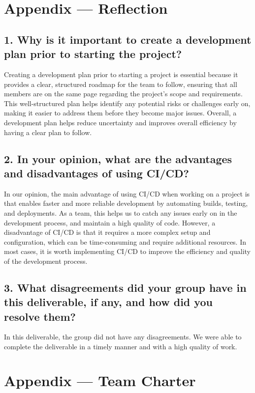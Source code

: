 \documentclass{article}
\begin{document}
\newpage{}

\section*{Appendix --- Reflection}

\iffalse
\wss{Not required for CAS 741}
\fi


\subsection*{1. Why is it important to create a development plan prior to starting the project?}
Creating a development plan prior to starting a project is essential because it provides a clear, structured roadmap for the team to follow, ensuring that all members are on the same page regarding the project's scope and requirements. This well-structured plan helps identify any potential risks or challenges early on, making it easier to address them before they become major issues. Overall, a development plan helps reduce uncertainty and improves overall efficiency by having a clear plan to follow.

\subsection*{2. In your opinion, what are the advantages and disadvantages of using CI/CD?}
In our opinion, the main advantage of using CI/CD when working on a project is that enables faster and more reliable development by automating builds, testing, and deployments. As a team, this helps us to catch any issues early on in the development process, and maintain a high quality of code. However, a disadvantage of CI/CD is that it requires a more complex setup and configuration, which can be time-consuming and require additional resources. In most cases, it is worth implementing CI/CD to improve the efficiency and quality of the development process.

\subsection*{3. What disagreements did your group have in this deliverable, if any, and how did you resolve them?}
In this deliverable, the group did not have any disagreements. We were able to complete the deliverable in a timely manner and with a high quality of work.

\newpage{}

\section*{Appendix --- Team Charter}
\end{document}
